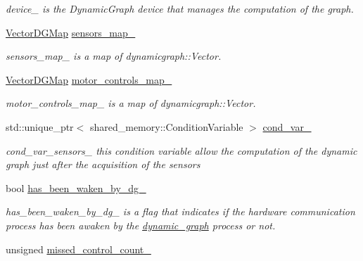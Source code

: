 \begin{DoxyCompactItemize}
\begin{DoxyCompactList}\small\item\em device\+\_\+ is the Dynamic\+Graph device that manages the computation of the graph. \end{DoxyCompactList}\item 
\hyperlink{namespacedynamic__graph_a51212ed7fa4ae81e7b362a27f09b7ab8}{Vector\+D\+G\+Map} \hyperlink{classdynamic__graph_1_1DynamicGraphManager_a896bf6cb22d2d88a5a6a307a2e44608e}{sensors\+\_\+map\+\_\+}
\begin{DoxyCompactList}\small\item\em sensors\+\_\+map\+\_\+ is a map of dynamicgraph\+::\+Vector. \end{DoxyCompactList}\item 
\hyperlink{namespacedynamic__graph_a51212ed7fa4ae81e7b362a27f09b7ab8}{Vector\+D\+G\+Map} \hyperlink{classdynamic__graph_1_1DynamicGraphManager_a03eabd2f08990a1dcc1caa652b701020}{motor\+\_\+controls\+\_\+map\+\_\+}
\begin{DoxyCompactList}\small\item\em motor\+\_\+controls\+\_\+map\+\_\+ is a map of dynamicgraph\+::\+Vector. \end{DoxyCompactList}\item 
std\+::unique\+\_\+ptr$<$ shared\+\_\+memory\+::\+Condition\+Variable $>$ \hyperlink{classdynamic__graph_1_1DynamicGraphManager_a02a7f9c293d982347f36b2a74f702c37}{cond\+\_\+var\+\_\+}\hypertarget{classdynamic__graph_1_1DynamicGraphManager_a02a7f9c293d982347f36b2a74f702c37}{}\label{classdynamic__graph_1_1DynamicGraphManager_a02a7f9c293d982347f36b2a74f702c37}

\begin{DoxyCompactList}\small\item\em cond\+\_\+var\+\_\+sensors\+\_\+ this condition variable allow the computation of the dynamic graph just after the acquisition of the sensors \end{DoxyCompactList}\item 
bool \hyperlink{classdynamic__graph_1_1DynamicGraphManager_a7e6cc5e58f1accce947f929d233a67fd}{has\+\_\+been\+\_\+waken\+\_\+by\+\_\+dg\+\_\+}\hypertarget{classdynamic__graph_1_1DynamicGraphManager_a7e6cc5e58f1accce947f929d233a67fd}{}\label{classdynamic__graph_1_1DynamicGraphManager_a7e6cc5e58f1accce947f929d233a67fd}

\begin{DoxyCompactList}\small\item\em has\+\_\+been\+\_\+waken\+\_\+by\+\_\+dg\+\_\+ is a flag that indicates if the hardware communication process has been awaken by the \hyperlink{namespacedynamic__graph}{dynamic\+\_\+graph} process or not. \end{DoxyCompactList}\item 
unsigned \hyperlink{classdynamic__graph_1_1DynamicGraphManager_abafc3cf4d8f7dc938f98b7eb07b7af9a}{missed\+\_\+control\+\_\+count\+\_\+}\hypertarget{classdynamic__graph_1_1DynamicGraphManager_abafc3cf4d8f7dc938f98b7eb07b7af9a}{}\label{classdynamic__graph_1_1DynamicGraphManager_abafc3cf4d8f7dc938f98b7eb07b7af9a}


\end{DoxyCompactItemize}
